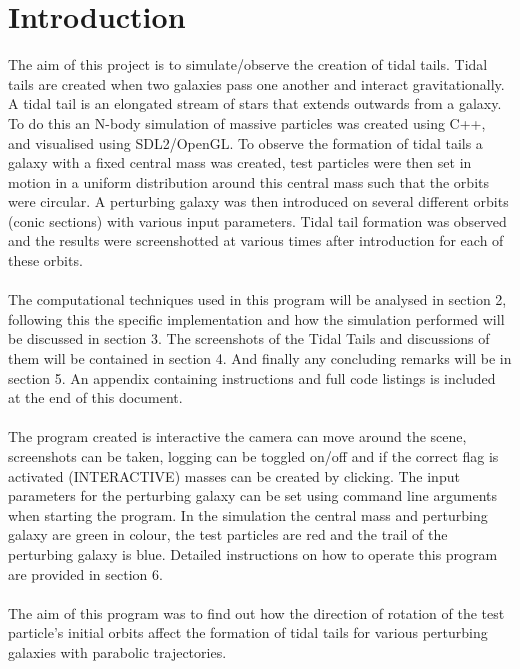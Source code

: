 \documentclass[10pt,a4paper]{article}
\begin{document}
\section{Introduction}
The aim of this project is to simulate/observe the creation of tidal tails. Tidal tails are created when two galaxies pass one another and interact gravitationally. A tidal tail is an elongated stream of stars that extends outwards from a galaxy.  To do this an N-body simulation of massive particles was created using C++, and visualised using SDL2/OpenGL. To observe the formation of tidal tails a galaxy with a fixed central mass was created, test particles were then set in motion in a uniform distribution around this central mass such that the orbits were circular. A perturbing galaxy was then introduced on several different orbits (conic sections) with various input parameters. Tidal tail formation was observed and the results were screenshotted at various times after introduction for each of these orbits. 
\\
\\
The computational techniques used in this program will be analysed in section 2, following this the specific implementation and how the simulation performed will be discussed in section 3. The screenshots of the Tidal Tails and discussions of them will be contained in section 4. And finally any concluding remarks will be in section 5. An appendix containing instructions and full code listings is included at the end of this document. 
\\
\\
The program created is interactive the camera can move around the scene, screenshots can be taken, logging can be toggled on/off and if the correct flag is activated (INTERACTIVE) masses can be created by clicking. The input parameters for the perturbing galaxy can be set using command line arguments when starting the program. In the simulation the central mass and perturbing galaxy are green in colour, the test particles are red and the trail of the perturbing galaxy is blue. Detailed instructions on how to operate this program are provided in section 6.
\\
\\
The aim of this program was to find out how the direction of rotation of the test particle's initial orbits affect the formation of tidal tails for various perturbing galaxies with parabolic trajectories.

\clearpage
\end{document}
